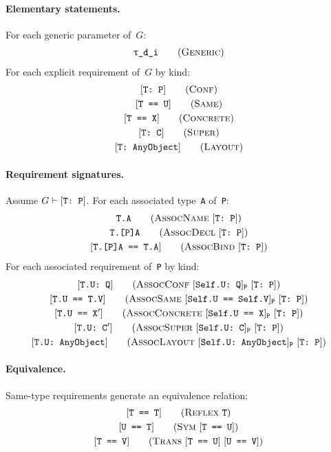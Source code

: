 \documentclass[../generics]{subfiles}
\begin{document}
\paragraph{Elementary statements.}
For each generic parameter  of~$G$:
\begin{gather*}
\GenericStepDef
\end{gather*}
For each explicit requirement of~$G$ by kind:
\begin{gather*}
\ConfStepDef\\
\SameStepDef\\
\ConcreteStepDef\\
\SuperStepDef\\
\LayoutStepDef
\end{gather*}

\paragraph{Requirement signatures.}
Assume $G\vdash[\texttt{T:~P}]$. For each associated type~\texttt{A} of~\texttt{P}:
\begin{gather*}
\AssocNameStepDef\\
\AssocDeclStepDef\\
\AssocBindStepDef
\end{gather*}
For each associated requirement of~\texttt{P} by kind:
\begin{gather*}
\AssocConfStepDef\\
\AssocSameStepDef\\
\AssocConcreteStepDef\\
\AssocSuperStepDef\\
\AssocLayoutStepDef
\end{gather*}

\paragraph{Equivalence.}
Same-type requirements generate an equivalence relation:
\begin{gather*}
\ReflexStepDef\\
\SymStepDef\\
\TransStepDef
\end{gather*}
\end{document}
